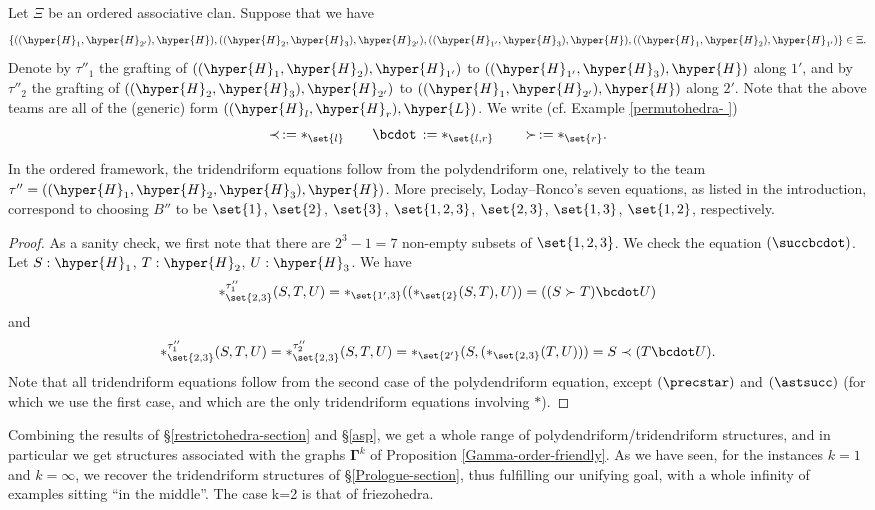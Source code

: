 Let $\Xi$ be an ordered associative clan. Suppose that we have 
$$\{((\hyper{H}_1,\hyper{H}_{2'}),\hyper{H}),   ((\hyper{H}_2,\hyper{H}_{3}),\hyper{H}_{2'}), 
((\hyper{H}_{1'},\hyper{H}_{3}),\hyper{H}),  ((\hyper{H}_1,\hyper{H}_{2}),\hyper{H}_{1'})\}\in\Xi.$$ Denote by $\tau''_1$ the grafting of $((\hyper{H}_1,\hyper{H}_{2}),\hyper{H}_{1'})$ to $((\hyper{H}_{1'},\hyper{H}_{3}),\hyper{H})$ along $1'$, and by $\tau''_2$ the grafting of $((\hyper{H}_2,\hyper{H}_{3}),\hyper{H}_{2'})$ to $((\hyper{H}_1,\hyper{H}_{2'}),\hyper{H})$ along $2'$.  
Note that the above teams are all of the (generic) form
$((\hyper{H}_l,\hyper{H}_r),\hyper{L})$.
We write (cf. Example \ref{permutohedra- })
$$\prec\,:=\ast_{\set{l}} \quad\quad \bcdot\,:=\ast_{\set{l,r}} \quad\quad \succ\,:=\ast_{\set{r}}.$$ 
\begin{proposition} \label{poly-implies-tri}
In the ordered framework, the tridendriform equations follow from the polydendriform one, relatively to the team $\tau''=((\hyper{H}_1, \hyper{H}_2, \hyper{H}_3), \hyper{H})$.
More precisely, Loday--Ronco's seven equations, as listed in the introduction, correspond to  choosing $B''$ to be $\set{1}$, $\set{2}$, $\set{3}$, $\set{1,2,3}$, $\set{2,3}$, $\set{1,3}$, $\set{1,2}$, respectively.
\end{proposition}
\begin{proof} 
As a sanity check, we first note that there are $2^3-1=7$ non-empty subsets of $\set{1,2,3}$. We check the equation $(\succbcdot)$. Let
$S:\hyper{H}_1$, $T:\hyper{H}_2$, $U:\hyper{H}_3$. We have
{\small
$$
\ast^{\tau''_1}_{\set{2,3}} (S,T,U)  =  \ast_{\set{1',3}}((\ast_{\set{2}}(S,T),U))=   ((S \succ T) \bcdot U)$$
and $$ \ast^{\tau''_1}_{\set{2,3}} (S,T,U)  = \ast^{\tau''_2}_{\set{2,3}} (S,T,U) =  \ast_{\set{2'}} (S,(\ast_{\set{2,3}}(T,U))) = S \prec (T \bcdot U).$$}
Note that all tridendriform equations follow from the second case of the polydendriform equation, except  $(\precstar)$  and  $(\astsucc)$ (for which we use the first case, and which are the only tridendriform equations involving $\ast$).
\end{proof}


Combining the results of \S\ref{restrictohedra-section} and \S\ref{asp}, we get a whole range of polydendriform/tridendriform structures, and in particular we get structures associated with the graphs  $\mathbf{\Gamma}^k$ of Proposition \ref{Gamma-order-friendly}. As we have seen,
for the instances $k=1$ and $k=\infty$, we recover the tridendriform structures of \S\ref{Prologue-section}, thus fulfilling our unifying goal, with a whole infinity of examples sitting ``in the middle''. The case k=2 is that of friezohedra.


